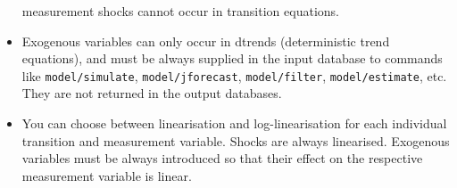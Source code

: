\begin{itemize}
   measurement shocks cannot occur in transition equations.
 \item
   Exogenous variables can only occur in dtrends (deterministic trend
   equations), and must be always supplied in the input database to
   commands like \texttt{model/simulate}, \texttt{model/jforecast},
   \texttt{model/filter}, \texttt{model/estimate}, etc. They are not
   returned in the output databases.
 \item
   You can choose between linearisation and log-linearisation for each
   individual transition and measurement variable. Shocks are always
   linearised. Exogenous variables must be always introduced so that
   their effect on the respective measurement variable is linear.
 \end{itemize}



